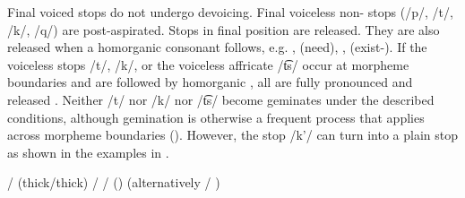 Final voiced stops do not undergo devoicing. Final voiceless non- stops (/p/, /t/, /k/, /q/) are post-aspirated. Stops in final position are released. They are also released when a homorganic consonant follows, e.g.  ,   (need),  ,  (exist-). If the voiceless stops /t/, /k/, or the voiceless affricate /t͡s/ occur at morpheme boundaries and are followed by homorganic , all  are fully pronounced and released . Neither /t/ nor /k/ nor /t͡s/ become geminates under the described conditions, although gemination is otherwise a frequent process that applies across morpheme boundaries (). However, the  stop /k’/ can turn into a plain stop as shown in the examples in .
%
\begin{exe}
	\ex	\label{ex:gemination A phon}
	\begin{xlist}
		\ex	{}\slash{}  (thick\slash{}thick)	\label{ex:bucce phon}
		\ex	{}\slash{} 	\label{ex:tuntce phon}
		\ex	{} /   () (alternatively  / )
		\label{ex:ikka phon}
	\end{xlist}
\end{exe}

